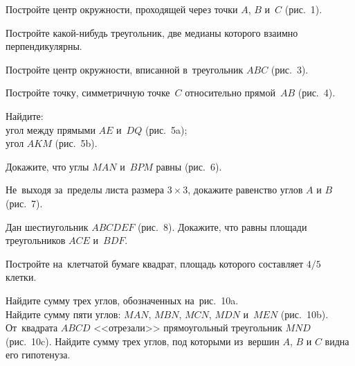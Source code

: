 \begin{problems}

\item
Постройте центр окружности, проходящей через точки $A$, $B$ и~$C$ (рис.~1).

\item
Постройте какой-нибудь треугольник, две медианы которого взаимно
перпендикулярны.

\item
Постройте центр окружности, вписанной в~треугольник $ABC$ (рис.~3).

\item
Постройте точку, симметричную точке~$C$ относительно прямой~$AB$ (рис.~4).

\item
Найдите:
\\
\subproblem угол между прямыми $AE$ и~$DQ$ (рис.~5a);
\\
\subproblem угол $AKM$ (рис.~5b).

\item
Докажите, что углы $MAN$ и~$BPM$ равны (рис.~6).

\item
Не~выходя за~пределы листа размера $3 \times 3$, докажите равенство
углов $A$ и $B$ (рис.~7).

\item
Дан шестиугольник $ABCDEF$ (рис.~8).
Докажите, что равны площади треугольников $ACE$ и~$BDF$.

\item
Постройте на~клетчатой бумаге квадрат, площадь которого составляет
$4/5$ клетки.

\item
\subproblem
Найдите сумму трех углов, обозначенных на~рис.~10a.
\\
\subproblem
Найдите сумму пяти углов: $MAN$, $MBN$, $MCN$, $MDN$ и~$MEN$ (рис.~10b).
\\
\subproblem
От~квадрата $ABCD$ <<отрезали>> прямоугольный треугольник $MND$ (рис.~10c).
Найдите сумму трех углов, под которыми из~вершин $A$, $B$ и $C$ видна его
гипотенуза.

\end{problems}

